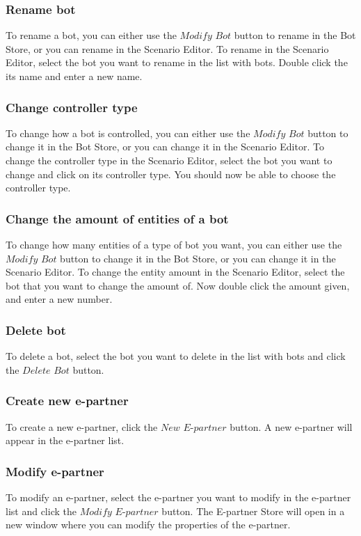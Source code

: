 \subsubsection{Rename bot}
To rename a bot, you can either use the $Modify$ $Bot$ button to rename in the Bot Store, or you can rename in the Scenario Editor. To rename in the Scenario Editor, select the bot you want to rename in the list with bots. Double click the its name and enter a new name.

\subsubsection{Change controller type}
To change how a bot is controlled, you can either use the $Modify$ $Bot$ button to change it in the Bot Store, or you can change it in the Scenario Editor. To change the controller type in the Scenario Editor, select the bot you want to change and click on its controller type. You should now be able to choose the controller type.

\subsubsection{Change the amount of entities of a bot}
To change how many entities of a type of bot you want, you can either use the $Modify$ $Bot$ button to change it in the Bot Store, or you can change it in the Scenario Editor. To change the entity amount in the Scenario Editor, select the bot that you want to change the amount of. Now double click the amount given, and enter a new number.

\subsubsection{Delete bot}
To delete a bot, select the bot you want to delete in the list with bots and click the $Delete$ $Bot$ button.

\subsubsection{Create new e-partner}
To create a new e-partner, click the $New$ $E$-$partner$ button. A new e-partner will appear in the e-partner list.

\subsubsection{Modify e-partner}
To modify an e-partner, select the e-partner you want to modify in the e-partner list and click the $Modify$ $E$-$partner$ button. The E-partner Store will open in a new window where you can modify the properties of the e-partner.

